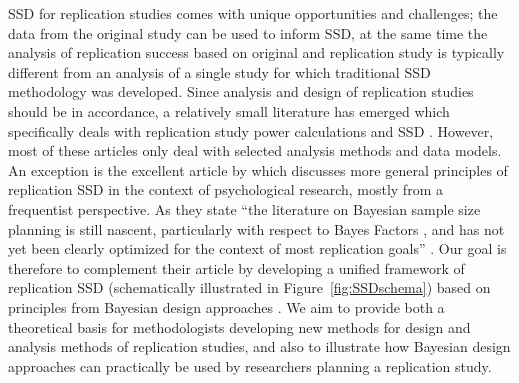 SSD for replication studies comes with unique opportunities and challenges; the
data from the original study can be used to inform SSD, at the same time the
analysis of replication success based on original and replication study is
typically different from an analysis of a single study for which traditional SSD
methodology was developed. Since analysis and design of replication studies
should be in accordance, a relatively small literature has emerged which
specifically deals with replication study power calculations and SSD
\citep{Bayarri2002, Goodman1992, Senn2002, Anderson2017, Micheloud2020,
  vanZwet2022, Held2020, Pawel2022b, Hedges2021, Anderson2022}. However, most of
these articles only deal with selected analysis methods and data models. %
An exception is the excellent article by \citet{Anderson2022} which discusses
more general principles of replication SSD in the context of psychological
research, mostly from a frequentist perspective. As they state ``the literature
on Bayesian sample size planning is still nascent, particularly with respect to
Bayes Factors \citep{Schoenbrodt2017}, and has not yet been clearly optimized
for the context of most replication goals'' \citep[p. 18]{Anderson2022}. Our
goal is therefore to complement their article by developing a unified framework
of replication SSD (schematically illustrated in Figure~\ref{fig:SSDschema})
based on principles from Bayesian design approaches \citep{Spiegelhalter1986b,
  Spiegelhalter1986c, Weiss1997, OHagan2001b, Gelfand2002, DeSantis2004,
  Spiegelhalter2004, Schoenbrodt2017, Pek2019, Kunzmann2021, Park2022,
  Grieve2022}. We aim to provide both a theoretical basis for methodologists
developing new methods for design and analysis methods of replication studies,
and also to illustrate how Bayesian design approaches can practically be used by
researchers planning a replication study.

